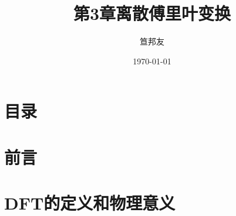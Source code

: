 \documentclass[notheorems,compress,mathserif,table]{beamer}
\title{\heiti 第3章\quad 离散傅里叶变换}
\author[\textcolor{blue}]{{\sihao\kaishu  笪邦友}}
\institute{\sihao\lishu  \textcolor{violet}{中南民族大学~~ 电子信息工程学院}}
\date{\fangsong\today}
\begin{document}
\kaishu
\frame{ \titlepage }
\section*{目录}
\section*{前言}
%
%
%
\section{DFT的定义和物理意义}
\end{document}
